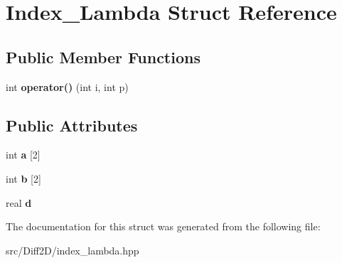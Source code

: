 \hypertarget{structIndex__Lambda}{
\section{Index\_\-Lambda Struct Reference}
\label{structIndex__Lambda}
}
\subsection*{Public Member Functions}
\begin{DoxyCompactItemize}
\item 
\hypertarget{structIndex__Lambda_af8225252f38290763a8aae14a0660a02}{
int {\bfseries operator()} (int i, int p)}
\label{structIndex__Lambda_af8225252f38290763a8aae14a0660a02}

\end{DoxyCompactItemize}
\subsection*{Public Attributes}
\begin{DoxyCompactItemize}
\item 
\hypertarget{structIndex__Lambda_acdf68b7c6f870f4eeb4ee9d8183e0c73}{
int {\bfseries a} \mbox{[}2\mbox{]}}
\label{structIndex__Lambda_acdf68b7c6f870f4eeb4ee9d8183e0c73}

\item 
\hypertarget{structIndex__Lambda_aaa095d0d1b30bc698d5a816ff0199951}{
int {\bfseries b} \mbox{[}2\mbox{]}}
\label{structIndex__Lambda_aaa095d0d1b30bc698d5a816ff0199951}

\item 
\hypertarget{structIndex__Lambda_a34e9306034a5059d37f4ab53d79ea5c7}{
real {\bfseries d}}
\label{structIndex__Lambda_a34e9306034a5059d37f4ab53d79ea5c7}

\end{DoxyCompactItemize}


The documentation for this struct was generated from the following file:\begin{DoxyCompactItemize}
\item 
src/Diff2D/index\_\-lambda.hpp\end{DoxyCompactItemize}
